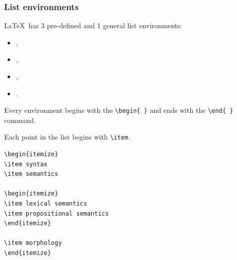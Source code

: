 \begin{frame}[fragile]
\frametitle{List environments}

\LaTeX\ has 3 pre-defined and 1 general list environments:

\begin{itemize}
	\item \alert<2->{},
	\item \alert<2->{},
	\item \alert<2->{},

	\item {}.
\end{itemize}

\pause 

Every environment begins with the \lstinline|\begin{ }| and ends with the \lstinline|\end{ }| command.

Each point in the list begins with \lstinline|\item|.  
%
%

\begin{multicols}{2}
\begin{lstlisting}
\begin{itemize}
\item syntax
\item semantics 

\begin{itemize}
\item lexical semantics
\item propositional semantics
\end{itemize}

\item morphology
\end{itemize}
\end{lstlisting}
\columnbreak{}
\end{multicols}

\end{frame}

